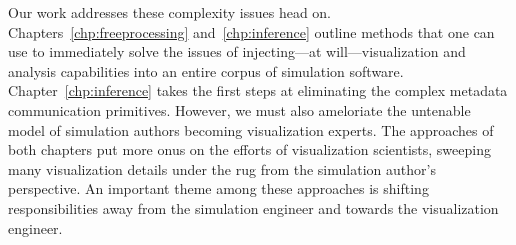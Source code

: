 Our work addresses these complexity issues head on.
Chapters~\ref{chp:freeprocessing} and~\ref{chp:inference} outline
methods that one can use to immediately solve the issues of
injecting---at will---visualization and analysis capabilities into an
entire corpus of simulation software.  Chapter~\ref{chp:inference}
takes the first steps at eliminating the complex metadata communication
primitives.  However, we must also ameloriate the untenable model of
simulation authors becoming visualization experts.  The approaches of
both chapters put more onus on the efforts of visualization scientists,
sweeping many visualization details under the rug from the simulation
author's perspective.  An important theme among these approaches is
shifting responsibilities away from the simulation engineer and towards
the visualization engineer.

